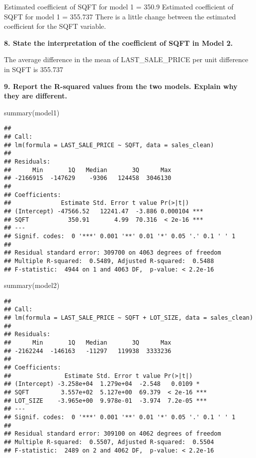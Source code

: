 \documentclass[
]{article}
\newenvironment{Shaded}{\begin{snugshade}}{\end{snugshade}}
\newcommand{\FunctionTok}[1]{\textcolor[rgb]{0.00,0.00,0.00}{#1}}
\newcommand{\NormalTok}[1]{#1}
\begin{document}
Estimated coefficient of SQFT for model 1 = 350.9 Estimated coefficient
of SQFT for model 1 = 355.737 There is a little change between the
estimated coefficient for the SQFT variable.

\textbf{8. State the interpretation of the coefficient of SQFT in Model
2.}

The average difference in the mean of LAST\_SALE\_PRICE per unit
difference in SQFT is 355.737

\textbf{9. Report the R-squared values from the two models. Explain why
they are different.}

\begin{Shaded}
\begin{Highlighting}[]
\FunctionTok{summary}\NormalTok{(model1)}
\end{Highlighting}
\end{Shaded}

\begin{verbatim}
## 
## Call:
## lm(formula = LAST_SALE_PRICE ~ SQFT, data = sales_clean)
## 
## Residuals:
##      Min       1Q   Median       3Q      Max 
## -2166915  -147629    -9306   124458  3046130 
## 
## Coefficients:
##              Estimate Std. Error t value Pr(>|t|)    
## (Intercept) -47566.52   12241.47  -3.886 0.000104 ***
## SQFT           350.91       4.99  70.316  < 2e-16 ***
## ---
## Signif. codes:  0 '***' 0.001 '**' 0.01 '*' 0.05 '.' 0.1 ' ' 1
## 
## Residual standard error: 309700 on 4063 degrees of freedom
## Multiple R-squared:  0.5489, Adjusted R-squared:  0.5488 
## F-statistic:  4944 on 1 and 4063 DF,  p-value: < 2.2e-16
\end{verbatim}

\begin{Shaded}
\begin{Highlighting}[]
\FunctionTok{summary}\NormalTok{(model2)}
\end{Highlighting}
\end{Shaded}

\begin{verbatim}
## 
## Call:
## lm(formula = LAST_SALE_PRICE ~ SQFT + LOT_SIZE, data = sales_clean)
## 
## Residuals:
##      Min       1Q   Median       3Q      Max 
## -2162244  -146163   -11297   119938  3333236 
## 
## Coefficients:
##               Estimate Std. Error t value Pr(>|t|)    
## (Intercept) -3.258e+04  1.279e+04  -2.548   0.0109 *  
## SQFT         3.557e+02  5.127e+00  69.379  < 2e-16 ***
## LOT_SIZE    -3.965e+00  9.978e-01  -3.974  7.2e-05 ***
## ---
## Signif. codes:  0 '***' 0.001 '**' 0.01 '*' 0.05 '.' 0.1 ' ' 1
## 
## Residual standard error: 309100 on 4062 degrees of freedom
## Multiple R-squared:  0.5507, Adjusted R-squared:  0.5504 
## F-statistic:  2489 on 2 and 4062 DF,  p-value: < 2.2e-16
\end{verbatim}
\end{document}
